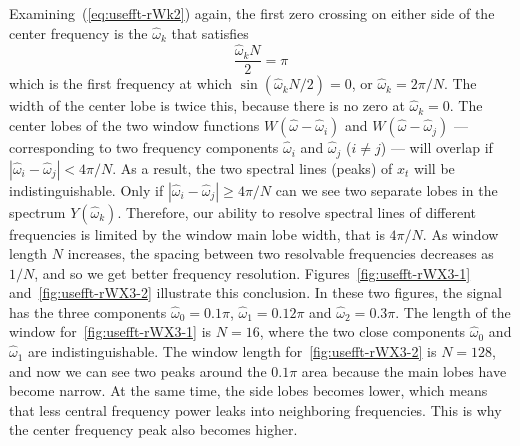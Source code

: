 Examining~(\ref{eq:usefft-rWk2}) again, the first zero crossing on
either side of the center frequency is the $\hat{\omega}_k$ that
satisfies
\begin{equation}
\frac{\hat{\omega}_k N}{2} = \pi
\end{equation}
which is the first frequency at which $\sin(\hat{\omega}_kN/2)=0$, or
$\hat{\omega}_k=2\pi/N$. The width of the center lobe is twice this,
because there is no zero at $\hat{\omega}_k=0$. The center lobes of
the two window functions $W(\hat{\omega}-\hat{\omega}_i)$ and
$W(\hat{\omega}-\hat{\omega}_j)$ --- corresponding to two frequency
components $\hat{\omega}_i$ and $\hat{\omega}_j$ ($i \ne j$) --- will
overlap if $|\hat{\omega}_i - \hat{\omega}_j|<4\pi/N$.  As a result,
the two spectral lines (peaks) of $x_t$ will be
indistinguishable. Only if $|\hat{\omega}_i - \hat{\omega}_j|\ge
4\pi/N$ can we see two separate lobes in the spectrum
$Y(\hat{\omega}_k)$. Therefore, our ability to resolve spectral lines
of different frequencies is limited by the window main lobe width,
that is $4\pi/N$. As window length $N$ increases, the spacing between
two resolvable frequencies decreases as $1/N$, and so we get better
frequency resolution. Figures~\ref{fig:usefft-rWX3-1}
and~\ref{fig:usefft-rWX3-2} illustrate this conclusion. In these two
figures, the signal has the three components $\hat{\omega}_0=0.1\pi$,
$\hat{\omega}_1=0.12\pi$ and $\hat{\omega}_2=0.3\pi$. The length of
the window for~\ref{fig:usefft-rWX3-1} is $N=16$, where the two close
components $\hat{\omega}_0$ and $\hat{\omega}_1$ are
indistinguishable. The window length for~\ref{fig:usefft-rWX3-2} is
$N=128$, and now we can see two peaks around the $0.1\pi$ area because
the main lobes have become narrow. At the same time, the side lobes
becomes lower, which means that less central frequency power leaks
into neighboring frequencies. This is why the center frequency peak
also becomes higher.

